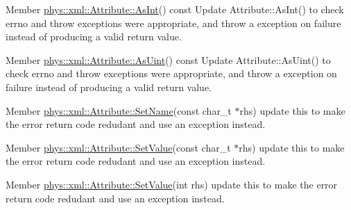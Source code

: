 \label{dd/da0/todo__todo000043}
\hypertarget{dd/da0/todo__todo000043}{}
 
\begin{DoxyDescription}
\item[Member \hyperlink{classphys_1_1xml_1_1Attribute_ada1f2e45ce636ad8482972263364e7fa}{phys::xml::Attribute::AsInt}() const  ]Update Attribute::AsInt() to check errno and throw exceptions were appropriate, and throw a exception on failure instead of producing a valid return value. 
\end{DoxyDescription}

\label{dd/da0/todo__todo000044}
\hypertarget{dd/da0/todo__todo000044}{}
 
\begin{DoxyDescription}
\item[Member \hyperlink{classphys_1_1xml_1_1Attribute_ad00ec5857fc4afcda892a0057419a9a0}{phys::xml::Attribute::AsUint}() const  ]Update Attribute::AsUint() to check errno and throw exceptions were appropriate, and throw a exception on failure instead of producing a valid return value. 
\end{DoxyDescription}

\label{dd/da0/todo__todo000047}
\hypertarget{dd/da0/todo__todo000047}{}
 
\begin{DoxyDescription}
\item[Member \hyperlink{classphys_1_1xml_1_1Attribute_af669654308122897f98858563375bf4c}{phys::xml::Attribute::SetName}(const char\_\-t $\ast$rhs) ]update this to make the error return code redudant and use an exception instead. 
\end{DoxyDescription}

\label{dd/da0/todo__todo000037}
\hypertarget{dd/da0/todo__todo000037}{}
 
\begin{DoxyDescription}
\item[Member \hyperlink{classphys_1_1xml_1_1Attribute_a470512fcd8b4f7609319bf85df100aaa}{phys::xml::Attribute::SetValue}(const char\_\-t $\ast$rhs) ]update this to make the error return code redudant and use an exception instead. 
\end{DoxyDescription}

\label{dd/da0/todo__todo000038}
\hypertarget{dd/da0/todo__todo000038}{}
 
\begin{DoxyDescription}
\item[Member \hyperlink{classphys_1_1xml_1_1Attribute_a693f7bd8015866c3c4979101c343ce50}{phys::xml::Attribute::SetValue}(int rhs) ]update this to make the error return code redudant and use an exception instead. 
\end{DoxyDescription}

